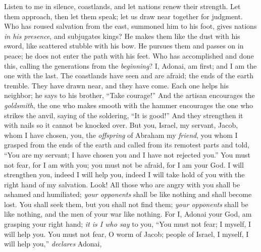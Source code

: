 \begin{biblechapter} %
 Listen to me in silence, coastlands, 
and let nations renew their strength. 
Let them approach, then let them speak; 
let us draw near together for judgment.
\verse Who has roused salvation from the east, 
summoned him to his foot, 
gives nations \textit{in his presence}, 
and subjugates kings? 
He makes them like the dust with his sword, 
like scattered stubble with his bow.
\verse He pursues them and passes on in peace; 
he does not enter the path with his feet.
\verse Who has accomplished and done this, 
calling the generations from the \textit{beginning}? 
I, Adonai, am first; 
and I am the one with the last.
\verse The coastlands have seen and are afraid; 
the ends of the earth tremble. 
They have drawn near, 
and they have come.
\verse Each one helps his neighbor; 
he says to his brother, “Take courage!”
\verse And the artisan encourages the \textit{goldsmith}, 
the one who makes smooth with the hammer encourages the one who strikes the anvil, 
saying of the soldering, “It is good!” 
And they strengthen it with nails so it cannot be knocked over.
\verse But you, Israel, my servant, Jacob, whom I have chosen, 
you, the \textit{offspring} of Abraham my \textit{friend},
\verse you whom I grasped from the ends of the earth 
and called from its remotest parts 
and told, “You are my servant; 
I have chosen you and I have not rejected you.”
\verse You must not fear, for I am with you; 
you must not be afraid, for I am your God. 
I will strengthen you, indeed I will help you, 
indeed I will take hold of you with the right hand of my salvation.
\verse Look! All those who are angry with you shall be ashamed and humiliated; 
\textit{your opponents} shall be like nothing and shall become lost.
\verse You shall seek them, 
but you shall not find them; 
\textit{your opponents} shall be like nothing, 
and the men of your war like nothing.
\verse For I, Adonai your God, am grasping your right hand; 
\textit{it is I who say} to you, 
“You must not fear; 
I myself, I will help you.
\verse You must not fear, O worm of Jacob; 
people of Israel, 
I myself, I will help you,” \textit{declares} Adonai, 

\end{biblechapter}
